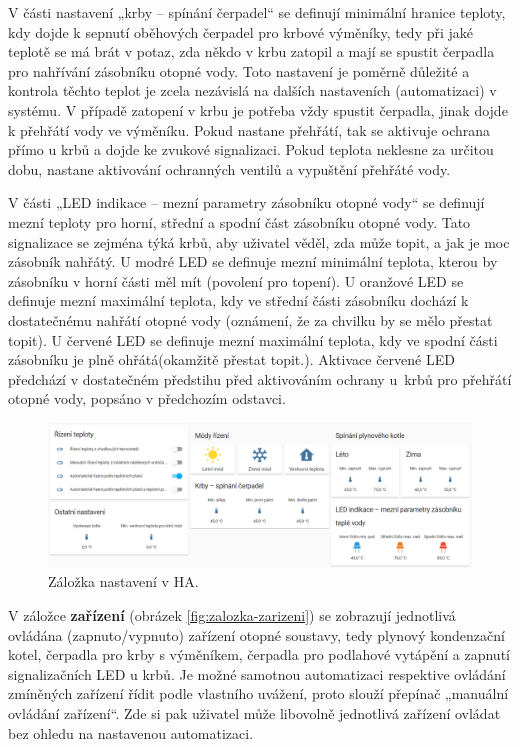 V části nastavení „krby – spínání čerpadel“ se definují minimální hranice teploty, kdy dojde k sepnutí oběhových čerpadel pro krbové výměníky, tedy při jaké teplotě se má brát v potaz, zda někdo v krbu zatopil a mají se spustit čerpadla pro nahřívání zásobníku otopné vody. Toto nastavení je poměrně důležité a kontrola těchto teplot je zcela nezávislá na dalších nastaveních (automatizaci) v systému. V případě zatopení v krbu je potřeba vždy spustit čerpadla, jinak dojde k přehřátí vody ve výměníku. Pokud nastane přehřátí, tak se  aktivuje ochrana přímo u krbů a dojde ke zvukové signalizaci. Pokud teplota neklesne za určitou dobu, nastane aktivování ochranných ventilů a vypuštění přehřáté vody.


V části „LED indikace – mezní parametry zásobníku otopné vody“ se definují mezní teploty pro horní, střední a spodní část zásobníku otopné vody. Tato signalizace se zejména týká krbů, aby uživatel věděl, zda může topit, a jak je moc zásobník nahřátý. U modré LED se definuje mezní minimální teplota, kterou by zásobníku v horní části měl mít (povolení pro topení). U oranžové LED se definuje mezní maximální teplota, kdy ve střední části zásobníku dochází k dostatečnému nahřátí otopné vody (oznámení, že za chvilku by se mělo přestat topit). U červené LED se definuje mezní maximální teplota, kdy ve spodní části zásobníku je plně ohřátá(okamžitě přestat topit.). Aktivace červené LED předchází v dostatečném předstihu před aktivováním ochrany u~krbů pro přehřátí otopné vody, popsáno v předchozím odstavci.

\begin{figure}[H]
    \centering
    \includegraphics[width=\textwidth]{images/software-ha/zalozka-nastaveni.png}
    \caption{Záložka nastavení v HA.}
    \label{fig:zalozka-nastaveni}
\end{figure}

V záložce \textbf{zařízení} (obrázek \ref{fig:zalozka-zarizeni}) se zobrazují jednotlivá ovládána (zapnuto/vypnuto) zařízení otopné soustavy, tedy plynový kondenzační kotel, čerpadla pro krby s výměníkem, čerpadla pro podlahové vytápění a zapnutí signalizačních LED u krbů. Je možné samotnou automatizaci respektive ovládání zmíněných zařízení řídit podle vlastního uvážení, proto slouží přepínač „manuální ovládání zařízení“. Zde si pak uživatel může libovolně jednotlivá zařízení ovládat bez ohledu na nastavenou automatizaci.

